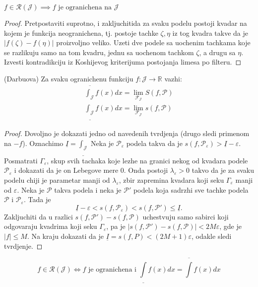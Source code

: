 \documentclass[a4paper,12pt]{article}
\newcommand{\f}{\mathscr{F}}
\newcommand{\RR}{\mathbb{R}}
\newcommand{\eps}{\varepsilon}
\begin{document}
\begin{lema}
	\( f \in \mathcal R (\mathcal J) \implies f \text{ je ogranichena na } \mathcal J \) 
\end{lema}
\begin{proof}
	Pretpostaviti suprotno, i zakljuchitida za svaku podelu postoji kvadar na kojem je funkcija
	neogranichena, tj. postoje tachke $\zeta, \eta$ iz tog kvadra takve da je \( |f(\zeta) - f(\eta)| \) 
	proizvoljno veliko. Uzeti dve podele sa uochenim tachkama koje se razlikuju samo na tom kvadru,
	jednu sa uochenom tachkom $\zeta$, a drugu sa $\eta$. Izvesti kontradikciju iz Koshijevog kriterijuma
	postojanja limesa po filteru.
\end{proof}

\begin{tma}(Darbuova)
	Za svaku ogranichenu funkciju $f:\mathcal J \to \RR$ vazhi:
	\begin{align*}
		\overline{\int_{\mathcal J}}f(x)dx = \lim_{\f _{\mathcal J}} S(f, \mathcal P)\\
		\underline{\int_{\mathcal J}}f(x)dx = \lim_{\f _{\mathcal J}} s(f, \mathcal P)
	\end{align*}
\end{tma}
\begin{proof}
	Dovoljno je dokazati jedno od navedenih tvrdjenja (drugo sledi primenom na $-f$). Oznachimo $\underline I = \underline{\int_{\mathcal J}}$
	Neka je $\mathcal P_\eps$ podela takva da je $s(f, \mathcal P _\eps) > \underline I - \eps$. Posmatrati $\Gamma_\eps$, skup 
	svih tachaka koje lezhe na granici nekog od kvadara podele $\mathcal P_\eps$ i dokazati da je on Lebegove mere 0.
	Onda postoji $\lambda_\eps > 0$ takvo da je za svaku podelu chiji je parametar manji od $\lambda_\eps$, zbir zapremina
	kvadara koji seku $\Gamma_\eps$ manji od $\eps$. Neka je $\mathcal P$ takva podela i neka je $\mathcal P'$ podela koja
	sadrzhi sve tachke podela $\mathcal P$ i $\mathcal P_\eps$. Tada je 
	\[ \underline I - \eps < s(f, \mathcal P_\eps) < s(f, \mathcal P') \leq \underline I .\] 
	Zakljuchiti da u razlici $s(f, \mathcal P') - s(f,\mathcal P)$ uchestvuju samo sabirci koji odgovaraju kvadrima koji
	seku $\Gamma_\eps$, pa je $|s(f, \mathcal P') - s(f,\mathcal P)| < 2M\eps$, gde je $|f| \leq M$. Na kraju dokazati da 
	je $\underline I = s(f, P) < (2M+1)\eps$, odakle sledi tvrdjenje.
\end{proof}

\begin{posl}
	\[ f \in \mathcal R(\mathcal J) \iff f \text{ je ogranichena i } \underline \int f(x)dx = \overline \int f(x)dx\] 
\end{posl}
\end{document}
